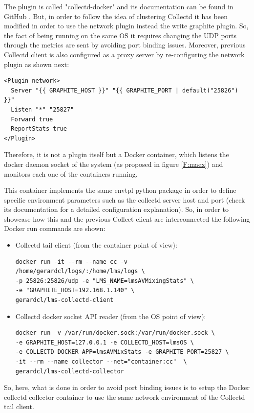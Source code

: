 The plugin is called "collectd-docker" and its documentation can be found in GitHub \cite{cdcontainer}. But, in order to follow the idea of clustering Collectd it has been modified in order to use the network plugin instead the write graphite plugin. So, the fact of being running on the same OS it requires changing the UDP ports through the metrics are sent by avoiding port binding issues. Moreover, previous Collectd client is also configured as a proxy server by re-configuring the network plugin as shown next: 

\begin{verbatim}
<Plugin network>
  Server "{{ GRAPHITE_HOST }}" "{{ GRAPHITE_PORT | default("25826") }}"
  Listen "*" "25827"
  Forward true
  ReportStats true
</Plugin>
\end{verbatim}

Therefore, it is not a plugin itself but a Docker container, which listens the docker daemon socket of the system (as proposed in figure \ref{F:maex}) and monitors each one of the containers running.

This container implements the same envtpl python package in order to define specific environment parameters such as the collectd server host and port (check its documentation for a detailed configuration explanation). So, in order to showcase how this and the previous Collect client are interconnected the following Docker run commands are shown:

\begin{itemize}
\item Collectd tail client (from the container point of view):
\begin{verbatim}
docker run -it --rm --name cc -v /home/gerardcl/logs/:/home/lms/logs \
-p 25826:25826/udp -e "LMS_NAME=lmsAVMixingStats" \
-e "GRAPHITE_HOST=192.168.1.140" \
gerardcl/lms-collectd-client
\end{verbatim}
\item Collectd docker socket API reader (from the OS point of view):
\begin{verbatim}
docker run -v /var/run/docker.sock:/var/run/docker.sock \
-e GRAPHITE_HOST=127.0.0.1 -e COLLECTD_HOST=lmsOS \
-e COLLECTD_DOCKER_APP=lmsAVMixStats -e GRAPHITE_PORT=25827 \
-it --rm --name collector --net="container:cc"  \
gerardcl/lms-collectd-collector
\end{verbatim}
\end{itemize}

So, here, what is done in order to avoid port binding issues is to setup the Docker collectd collector container to use the same network environment of the Collectd tail client.

